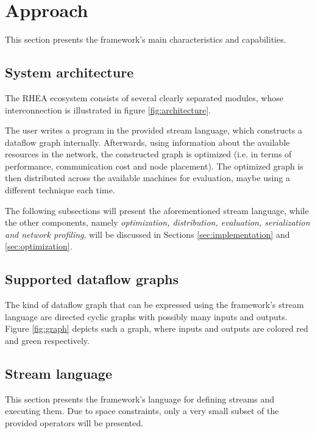 \documentclass[sigplan,review,anonymous]{acmart}
\begin{document}
\section{Approach} \label{sec:approach}

This section presents the framework's main characteristics and capabilities.

\subsection{System architecture}

The \textsc{RHEA} ecosystem consists of several
clearly separated modules, whose interconnection is illustrated in figure
\ref{fig:architecture}.


The user writes a program in the provided stream language, which constructs a
dataflow graph internally. Afterwards, using information about the available
resources in the network, the constructed graph is optimized (i.e. in terms of
performance, communication cost and node placement). The optimized graph is then
distributed across the available machines for evaluation, maybe using a
different technique each time.

The following subsections will present the aforementioned stream language, while
the other components, namely \textit{optimization, distribution, evaluation,
serialization and network profiling}, will be discussed in Sections
\ref{sec:implementation} and \ref{sec:optimization}.

\subsection{Supported dataflow graphs}

The kind of dataflow graph that can be expressed using the framework's stream
language are directed cyclic graphs with possibly many inputs and outputs.
Figure \ref{fig:graph} depicts such a graph, where inputs and outputs are
colored red and green respectively.


\subsection{Stream language} This section presents the framework's language for
defining streams and executing them. Due to space constraints, only a very small
subset of the provided operators will be presented.
\end{document}
